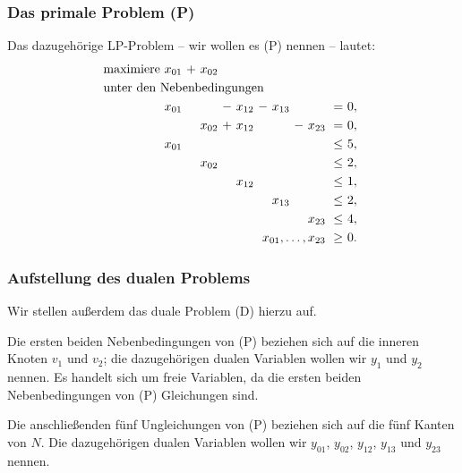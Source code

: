 \documentclass[smaller]{beamer}
\begin{document}
\begin{frame}
\frametitle{Das primale Problem (P)}
Das dazugehörige LP-Problem -- wir wollen es (P) nennen -- lautet:
\begin{align*}
\begin{alignedat}{7}
& \text{maximiere } & x_{01} &\ + &\ x_{02} & & & & & & & &  \\
& \rlap{unter den Nebenbedingungen} & & & & & & & & & & & \\
&& x_{01} &\   &\        &\ - &\ x_{12} &\ - &\ x_{13} &\   &\        &\    = &\ 0,\ \\
&&        &\   &\ x_{02} &\ + &\ x_{12} &\   &\        &\ - &\ x_{23} &\    = &\ 0,\ \\
&& x_{01} &\   &\        &\   &\        &\   &\        &\   &\        &\ \leq &\ 5,\ \\
&&        &\   &\ x_{02} &\   &\        &\   &\        &\   &\        &\ \leq &\ 2,\ \\
&&        &\   &\        &\   &\ x_{12} &\   &\        &\   &\        &\ \leq &\ 1,\ \\
&&        &\   &\        &\   &\        &\   &\ x_{13} &\   &\        &\ \leq &\ 2,\ \\
&&        &\   &\        &\   &\        &\   &\        &\   &\ x_{23} &\ \leq &\ 4,\ \\
&& & & & & & & & & \llap{$x_{01},\ldots,x_{23}$} &\ \geq &\ 0.\
\end{alignedat}
\end{align*}
\end{frame}

\begin{frame}
\frametitle{Aufstellung des dualen Problems}
Wir stellen außerdem das \alert{duale Problem} (D) hierzu auf. \\ \vspace*{0.2cm}

Die ersten beiden Nebenbedingungen von (P) beziehen sich auf die inneren Knoten $v_1$ und $v_2$; die dazugehörigen dualen Variablen wollen wir $y_1$ und $y_2$ nennen. Es handelt sich um freie Variablen, da die ersten beiden Nebenbedingungen von (P) Gleichungen sind. \\ \vspace*{0.2cm}

Die anschließenden fünf Ungleichungen von (P) beziehen sich auf die fünf Kanten von $N$. Die dazugehörigen dualen Variablen wollen wir $y_{01}$, $y_{02}$, $y_{12}$, $y_{13}$ und $y_{23}$ nennen.
\end{frame}
\end{document}
